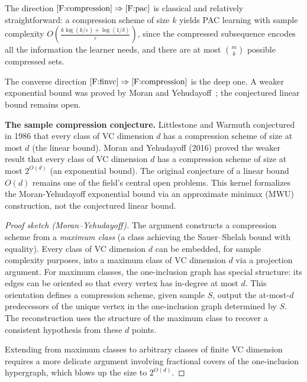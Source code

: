 The direction $\ref{F:compression} \Rightarrow \ref{F:pac}$ is classical
and relatively straightforward: a compression scheme of size $k$ yields PAC
learning with sample complexity $O\!\left(\frac{k\log(k/\varepsilon) +
\log(1/\delta)}{\varepsilon}\right)$, since the compressed subsequence encodes
all the information the learner needs, and there are at most $\binom{m}{k}$
possible compressed sets.

The converse direction $\ref{F:finvc} \Rightarrow \ref{F:compression}$ is the
deep one.  A weaker exponential bound was proved by Moran and
Yehudayoff~\cite{MoranYehudayoff2016}; the conjectured linear bound
remains open.

\begin{historical}
\textbf{The sample compression conjecture.}
Littlestone and Warmuth conjectured in 1986 that every class of VC dimension
$d$ has a compression scheme of size at most $d$ (the linear bound).
Moran and Yehudayoff (2016) proved the weaker result that every class of
VC dimension $d$ has a compression scheme of size at most $2^{O(d)}$
(an exponential bound). The original conjecture of a linear bound $O(d)$
remains one of the field's central open problems. This kernel formalizes
the Moran-Yehudayoff exponential bound via an approximate minimax (MWU)
construction, not the conjectured linear bound.
\end{historical}

\begin{proof}[Proof sketch (Moran--Yehudayoff)]
The argument constructs a compression scheme from a
\emph{maximum class} (a class achieving the Sauer--Shelah bound with
equality).  Every class of VC dimension $d$ can be embedded, for sample
complexity purposes, into a maximum class of VC dimension $d$ via a projection
argument.  For maximum classes, the one-inclusion graph has special structure:
its edges can be oriented so that every vertex has in-degree at most $d$.  This
orientation defines a compression scheme, given sample $S$, output the
at-most-$d$ predecessors of the unique vertex in the one-inclusion graph
determined by $S$.  The reconstruction uses the structure of the maximum class
to recover a consistent hypothesis from these $d$ points.

Extending from maximum classes to arbitrary classes of finite VC dimension
requires a more delicate argument involving fractional covers of the
one-inclusion hypergraph, which blows up the size to $2^{O(d)}$.
\end{proof}


